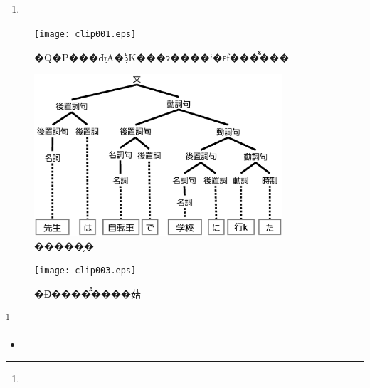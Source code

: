 \subsection{}

\begin{description}
  \item
\end{description}
\subsubsection{}
\begin{enumerate}
  \item
\end{enumerate}

\begin{figure}[tb]
  \begin{center}
    \texttt{[image: clip001.eps]}
  \end{center}
  \caption{�Q�P���Ԃ̘A�ڋK���ɂ����`�ԑf���͂̌���}
  \label{fig:clip001.eps}
\end{figure}

\begin{figure}[tb]
  \begin{center}
    \includegraphics[keepaspectratio=true,height=60mm]{clip002.eps}
  \end{center}
  \caption{���\���̗�}
  \label{fig:clip002.eps}
\end{figure}


\begin{figure}[htb]
  \begin{center}
    \texttt{[image: clip003.eps]}
  \end{center}
  \caption{�Ɖ����͂̉����菇}
  \label{fig:clip003.eps}
\end{figure}
\footnote{}
\newpage

\begin{itemize}
  \item
\end{itemize}

